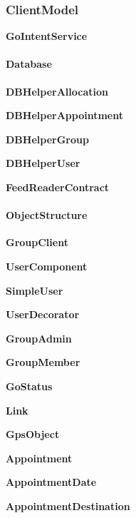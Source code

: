 \subsubsection{ClientModel}

\textbf{GoIntentService}

\paragraph{Database}

\textbf{DBHelperAllocation}

\textbf{DBHelperAppointment}

\textbf{DBHelperGroup}

\textbf{DBHelperUser}

\textbf{FeedReaderContract}

\paragraph{ObjectStructure}

\textbf{GroupClient}


\textbf{UserComponent}

\textbf{SimpleUser}

\textbf{UserDecorator}

\textbf{GroupAdmin}

\textbf{GroupMember}


\textbf{GoStatus}

\textbf{Link}

\textbf{GpsObject}


\textbf{Appointment}

\textbf{AppointmentDate}

\textbf{AppointmentDestination}








